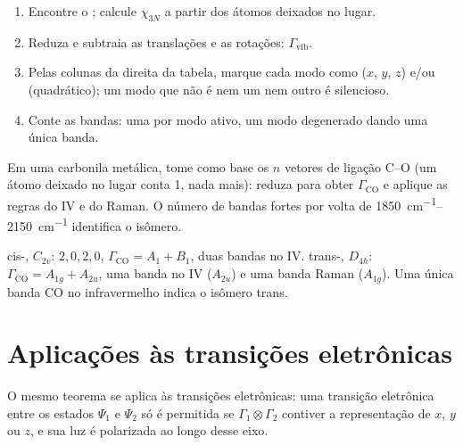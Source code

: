 \begin{method}\label{met:b3:group-theory-applied:vibrations}
\begin{enumerate}
  \item Encontre o ; calcule $\chi_{3N}$ a partir dos átomos deixados no lugar.
  \item Reduza e subtraia as translações e as rotações: $\Gamma_{\mathrm{vib}}$.
  \item Pelas colunas da direita da tabela, marque cada modo como 
        ($x$, $y$, $z$) e/ou  (quadrático); um modo que não é
        nem um nem outro é silencioso.
  \item Conte as bandas: uma por modo ativo, um modo degenerado dando uma única banda.
\end{enumerate}
\end{method}

\begin{method}\label{met:b3:group-theory-applied:co-count}
Em uma carbonila metálica, tome como base os $n$ vetores de ligação C--O (um
átomo deixado no lugar conta 1, nada mais): reduza para obter
$\Gamma_{\mathrm{CO}}$ e aplique as regras do IV e do Raman. O número de bandas
fortes por volta de \qtyrange{1850}{2150}{cm^{-1}} identifica o isômero.
\end{method}

\begin{example}\label{ex:b3:group-theory-applied:cis-trans}
cis-, $C_{2v}$:  $2, 0, 2, 0$, $\Gamma_{\mathrm{CO}} = A_1 + B_1$,
duas bandas no IV. trans-, $D_{4h}$: $\Gamma_{\mathrm{CO}} = A_{1g} + A_{2u}$, uma
banda no IV ($A_{2u}$) e uma banda Raman ($A_{1g}$). Uma única banda CO no
infravermelho indica o isômero trans.
\end{example}

\section{Aplicações às transições eletrônicas}

O mesmo teorema se aplica às transições eletrônicas: uma transição eletrônica
entre os estados $\Psi_1$ e $\Psi_2$ só é permitida se $\Gamma_1\otimes\Gamma_2$
contiver a representação de $x$, $y$ ou $z$, e sua luz é polarizada ao longo
desse eixo.

